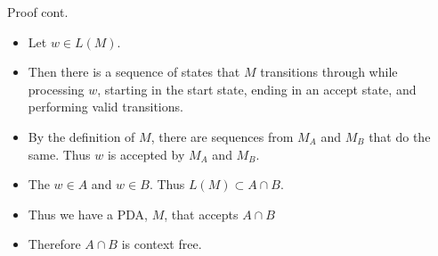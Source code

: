 \documentclass{beamer}
\begin{document}
\begin{frame}{Proof cont.}
    \begin{itemize}
        \item Let $w\in L(M)$.

        \item Then there is a sequence of states that $M$ transitions through while processing $w$, 
        starting in the start state, ending in an accept state, and performing valid transitions.

        \item By the definition of $M$, there are sequences from $M_A$ and $M_B$ that do the same. 
        Thus $w$ is accepted by $M_A$ and $M_B$. 

        \item The $w\in A$ and $w\in B$. Thus $L(M) \subset A\cap B$.

        \item Thus we have a PDA, $M$, that accepts $A\cap B$ 
        
        \item Therefore $A\cap B$ is context free.
    \end{itemize}
\end{frame}
\end{document}

